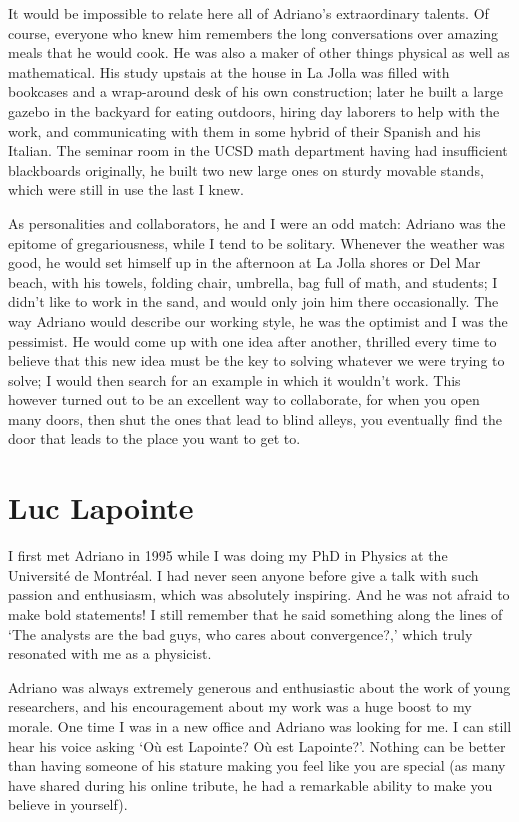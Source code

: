 \documentclass{notices}
\begin{document}
It would be impossible to relate here all of Adriano's extraordinary talents.  Of course, everyone who knew him remembers the long conversations over amazing meals that he would cook.  He was also a maker of other things physical as well as mathematical.  His study upstais at the house in La Jolla was filled with bookcases and a wrap-around desk of his own construction; later he built a large gazebo in the backyard for eating outdoors, hiring day laborers to help with the work, and communicating with them in some hybrid of their Spanish and his Italian.  The seminar room in the UCSD math department having had insufficient blackboards originally, he built two new large ones on sturdy movable stands, which were still in use the last I knew.

As personalities and collaborators, he and I were an odd match: Adriano was the epitome of gregariousness, while I tend to be solitary.  Whenever the weather was good, he would set himself up in the afternoon at La Jolla shores or Del Mar beach, with his towels, folding chair, umbrella, bag full of math, and students; I didn't like to work in the sand, and would only join him there occasionally.  The way Adriano would describe our working style, he was the optimist and I was the pessimist.  He would come up with one idea after another, thrilled every time to believe that this new idea must be the key to solving whatever we were trying to solve; I would then search for an example in which it wouldn't work.  This however turned out to be an excellent way to collaborate, for when you open many doors, then shut the ones that lead to blind alleys, you eventually find the door that leads to the place you want to get to.

\section*{Luc Lapointe}
I first met Adriano in 1995 while I was doing my PhD in Physics at the Université de Montréal.
I had never seen anyone before give a talk with such passion and enthusiasm, which was absolutely inspiring.
And he was not afraid to make bold statements! I still remember that he said something along the lines of `The analysts are the bad guys, who cares about convergence?,' which truly resonated with me as a physicist.

Adriano was always extremely generous and enthusiastic about the work of young researchers, and his encouragement about my work was a huge boost to my morale. One time I was in a new office and Adriano was looking for me.  I can still hear his voice asking `Où est Lapointe? Où est Lapointe?'.  Nothing can be better than having someone of his stature making you feel like you are special  (as many have shared during his online tribute, he had a remarkable ability to make you believe in yourself).
\end{document}
